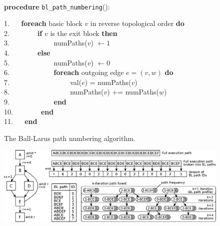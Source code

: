 \else
\begin{figure}[h!]
\caption{\label{alg:kblpp-bl-numbering} The Ball-Larus path numbering algorithm.}
\begin{small}
\begin{minipage}{0.9\textwidth}
\hrulefill\\
\textbf{procedure} {\tt bl\_path\_numbering}(): \\
\vspace{-2mm}

1. ~~ \textbf{foreach} basic block $v$ in reverse topological order \textbf{do}\\
2. ~~ ~~~~ \textbf{if} $v$ is the exit block \textbf{then}\\
3. ~~ ~~~~ ~~~~ numPaths($v$) $\gets 1$\\
4. ~~ ~~~~ \textbf{else}\\
5. ~~ ~~~~ ~~~~ numPaths($v$) $\gets 0$\\
6. ~~ ~~~~ ~~~~ \textbf{foreach} outgoing edge $e = (v, w)$ \textbf{do}\\
7. ~~ ~~~~ ~~~~ ~~~~ val($e$) = numPaths($v$)\\
8. ~~ ~~~~ ~~~~ ~~~~ numPaths($v$) += numPaths($w$)\\
9. ~~ ~~~~ ~~~~ \textbf{end}\\
10. ~~ ~~~~ \textbf{end}\\
11. ~~ \textbf{end}\\
\vspace{-1mm}
\hrulefill
\vspace{-2mm}
\end{minipage}
\end{small}
\end{figure}

\fi

\ifdefined\noauthorea
\begin{figure}[ht]
\centering
\includegraphics[width=\textwidth]{figures/kblpp-example/kblpp-example.eps}
\caption{\protect}
\end{figure}
\fi

